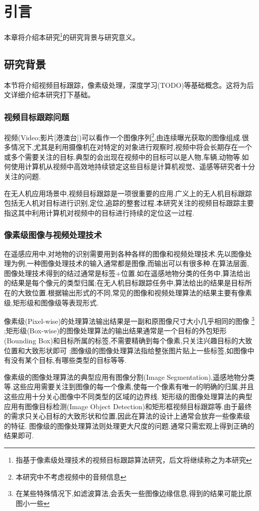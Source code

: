 
\chapter{引言}
本章将介绍本研究\footnote{指基于像素级处理技术的视频目标跟踪算法研究，后文将继续称之为本研究}的研究背景与研究意义。

\section{研究背景}
本节将介绍视频目标跟踪，像素级处理，深度学习(TODO)等基础概念。这将为后文详细介绍本研究打下基础。

\subsection{视频目标跟踪问题}
视频(Video;影片[港澳台])可以看作一个图像序列\footnote{本研究中不考虑视频中的音频信息},由连续曝光获取的图像组成.很多情况下,尤其是利用摄像机在对特定的对象进行观察时,视频中将会长期存在一个或多个需要关注的目标.典型的会出现在视频中的目标可以是人物,车辆,动物等.如何使用计算机从视频中高效地持续锁定这些目标是计算机视觉、遥感等研究者十分关注的问题.
\par
在无人机应用场景中,视频目标跟踪是一项很重要的应用.广义上的无人机目标跟踪包括无人机对目标进行识别,定位,追踪的整套过程.本研究关注的视频目标跟踪主要指这其中利用计算机对视频中的目标进行持续的定位这一过程.

\subsection{像素级图像与视频处理技术}
在遥感应用中,对地物的识别需要用到各种各样的图像和视频处理技术.先以图像处理为例,一种图像处理技术的输入通常都是图像,而输出可以有很多种.在算法层面,图像处理技术得到的结过通常是标签+位置.如在遥感地物分类的任务中,算法给出的结果是每个像元的类型归属;在无人机目标跟踪任务中,算法给出的结果是目标所在的大致位置.根据输出形式的不同,常见的图像和视频处理算法的结果主要有像素级,矩形级和图像级等表现形式.
\par
像素级(Pixel-wise)的处理算法输出结果是一副和原图像尺寸大小几乎相同的图像
\footnote{在某些特殊情况下,如滤波算法,会丢失一些图像边缘信息,得到的结果可能比原图小一些}
;矩形级(Box-wise)的图像处理算法的输出结果通常是一个目标的外包矩形(Bounding Box)和目标所属的标签,不需要精确到每个像素,只关注兴趣目标的大致位置和大致形状即可
;图像级的图像处理算法指给整张图片贴上一些标签,如图像中有没有某个目标,有哪些类型的目标等等.
\par
像素级的图像处理算法的典型应用有图像分割(Image Segmentation),遥感地物分类等.这些应用需要关注到图像的每一个像素,使每一个像素有唯一的明确的归属,并且这些应用十分关心图像中不同类型的区域的边界线.
矩形级的图像处理算法的典型应用有图像目标检测(Image Object Detection)和矩形框视频目标跟踪等.由于最终的需求只关心目标的大致形状和位置,因此在算法的设计上通常会放弃一些像素级的特征.
图像级的图像处理算法则处理更大尺度的问题.通常只需宏观上得到正确的结果即可.

